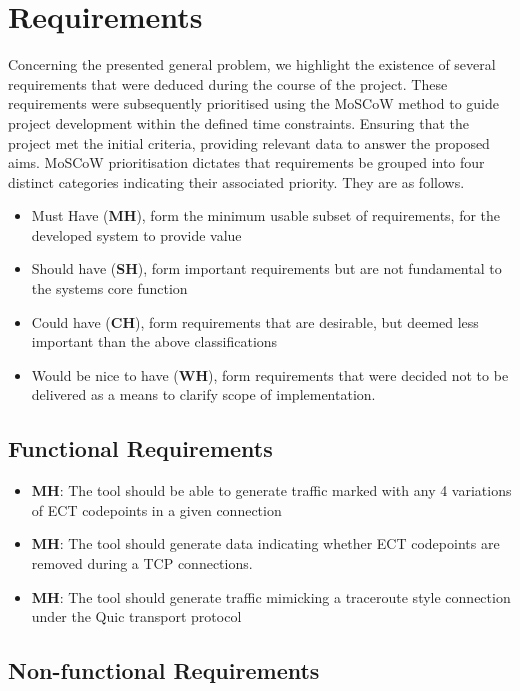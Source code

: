 \documentclass{l4proj}
\begin{document}
\section{Requirements}

Concerning the presented general problem, we highlight the existence of several requirements that were deduced during the course of the project. These requirements were subsequently prioritised using the MoSCoW method to guide project development within the defined time constraints. Ensuring that the project met the initial criteria, providing relevant data to answer the proposed aims. MoSCoW prioritisation dictates that requirements be grouped into four distinct categories indicating their associated priority. They are as follows.

\begin{itemize}
    \item Must Have (\textbf{MH}), form the minimum usable subset of requirements, for the developed system to provide value
    \item Should have (\textbf{SH}), form important requirements but are not fundamental to the systems core function
    \item Could have (\textbf{CH}), form requirements that are desirable, but deemed less important than the above classifications
    \item Would be nice to have (\textbf{WH}), form requirements that were decided not to be delivered as a means to clarify scope of implementation.
\end{itemize}

\subsection{Functional Requirements}

\begin{itemize}
    \item \textbf{MH}: The tool should be able to generate traffic marked with any 4 variations of ECT codepoints in a given connection
    \item \textbf{MH}: The tool should generate data indicating whether ECT codepoints are removed during a TCP connections.
    \item \textbf{MH}: The tool should generate traffic mimicking a traceroute style connection under the Quic transport protocol
\end{itemize}



\subsection{Non-functional Requirements}
\end{document}
